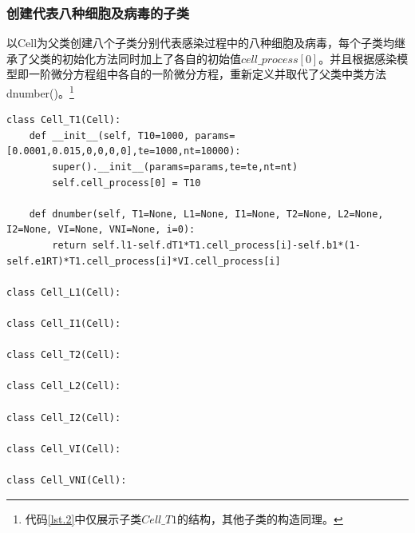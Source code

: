 \documentclass{ctexart}
\begin{document}
\subsubsection{创建代表八种细胞及病毒的子类}
以Cell为父类创建八个子类分别代表感染过程中的八种细胞及病毒，每个子类均继承了父类的初始化方法同时加上了各自的初始值$cell\_process[0]$。并且根据感染模型即一阶微分方程组中各自的一阶微分方程，重新定义并取代了父类中类方法dnumber()。\footnote{代码\ref{lst.2}中仅展示子类$Cell\_T1$的结构，其他子类的构造同理。}
\begin{lstlisting}[label={lst.2}, caption={Cell的子类代表感染过程中各类细胞及病毒}]
class Cell_T1(Cell):
    def __init__(self, T10=1000, params=[0.0001,0.015,0,0,0,0],te=1000,nt=10000):
        super().__init__(params=params,te=te,nt=nt)
        self.cell_process[0] = T10

    def dnumber(self, T1=None, L1=None, I1=None, T2=None, L2=None, I2=None, VI=None, VNI=None, i=0):
        return self.l1-self.dT1*T1.cell_process[i]-self.b1*(1-self.e1RT)*T1.cell_process[i]*VI.cell_process[i]

class Cell_L1(Cell):

class Cell_I1(Cell):

class Cell_T2(Cell):

class Cell_L2(Cell):

class Cell_I2(Cell):

class Cell_VI(Cell):

class Cell_VNI(Cell):

\end{lstlisting}
\end{document}
